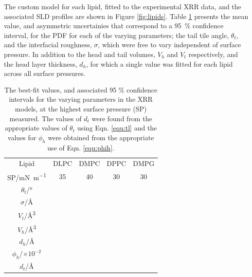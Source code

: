 \documentclass[%
 reprint,
 amsmath,amssymb,
 prl,
]{revtex4-1}
\begin{document}
The custom model for each lipid, fitted to the experimental XRR data, and the associated SLD profiles are shown in Figure \ref{fig:lipids}.
Table \ref{tab:liptab} presents the mean value, and asymmetric uncertainies that correspond to a \SI{95}{\percent} confidence interval, for the PDF for each of the varying parameters; the tail tile angle, $\theta_t$, and the interfacial roughness, $\sigma$, which were free to vary independent of surface pressure.
In addition to the head and tail volumes, $V_h$ and $V_t$ respectively, and the head layer thickness, $d_h$, for which a single value was fitted for each lipid across all surface pressures.
%
\begin{table}
	\caption{\label{tab:liptab} The best-fit values, and associated 95 \% confidence intervals for the varying parameters in the XRR models, at the highest surface pressure (SP) measured. The values of $d_t$ were found from the appropriate values of $\theta_t$ using Eqn. \ref{equ:tl} and the values for $\phi_h$ were obtained from the appropriate use of Eqn. \ref{equ:phih}.}
  \begin{ruledtabular}
	\begin{tabular}{ccccc}
		Lipid & DLPC & DMPC & DPPC & DMPG \\
    SP/\si{\milli\newton\per\meter} & 35 & 40 & 30 & 30 \\
		\hline
		$\theta_t$/\si{\degree} &  &  &  &  \\
		$\sigma$/\si{\angstrom} &  &  &  &  \\
    \hline
    $V_t$/\si{\cubic\angstrom} &  &  &  &  \\
		$V_h$/\si{\cubic\angstrom} &  &  &  &  \\
		$d_h$/\si{\angstrom} &  &  &  &  \\
    \hline
    $\phi_h$/$\times10^{-2}$ &  &  &  &  \\
		$d_t$/\si{\angstrom} &  &  &  &  \\
	\end{tabular}
  \end{ruledtabular}
\end{table}
%
\end{document}
